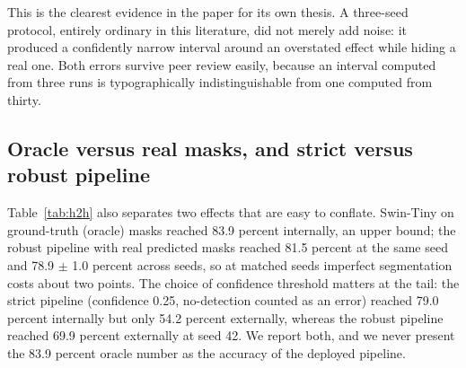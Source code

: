 \documentclass{elektr}
\begin{document}
This is the clearest evidence in the paper for its own thesis. A three-seed protocol, entirely ordinary in this literature, did not merely add noise: it produced a confidently narrow interval around an overstated effect while hiding a real one. Both errors survive peer review easily, because an interval computed from three runs is typographically indistinguishable from one computed from thirty.

\subsection{Oracle versus real masks, and strict versus robust pipeline}
\label{Res:oracle}
Table~\ref{tab:h2h} also separates two effects that are easy to conflate. Swin-Tiny on ground-truth (oracle) masks reached 83.9 percent internally, an upper bound; the robust pipeline with real predicted masks reached 81.5 percent at the same seed and 78.9 $\pm$ 1.0 percent across seeds, so at matched seeds imperfect segmentation costs about two points. The choice of confidence threshold matters at the tail: the strict pipeline (confidence 0.25, no-detection counted as an error) reached 79.0 percent internally but only 54.2 percent externally, whereas the robust pipeline reached 69.9 percent externally at seed 42. We report both, and we never present the 83.9 percent oracle number as the accuracy of the deployed pipeline.
\end{document}
